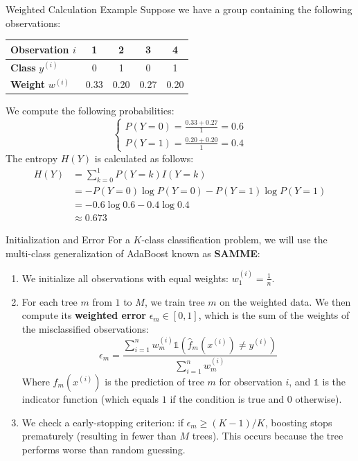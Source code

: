 \begin{frame}{Weighted Calculation Example}
	Suppose we have a group containing the following observations:
	\begin{table}
		\centering
		\begin{tabular}{|l|c|c|c|c|}
			\hline
			\textbf{Observation} $i$ & 1 & 2 & 3 & 4 \\
			\hline
			\textbf{Class} $y^{(i)}$ & 0 & 1 & 0 & 1 \\
			\hline
			\textbf{Weight} $w^{(i)}$ & 0.33 & 0.20 & 0.27 & 0.20 \\
			\hline
		\end{tabular}
	\end{table}
	We compute the following probabilities:
	\begin{equation*}
		\begin{cases}
			P(Y = 0) = \frac{0.33 + 0.27}{1} = 0.6 \\
			P(Y = 1) = \frac{0.20 + 0.20}{1} = 0.4
		\end{cases}
	\end{equation*}
	The entropy $H(Y)$ is calculated as follows:
	\begin{equation*}
		\begin{aligned}
			H(Y) 
			&= \sum_{k=0}^1 P(Y = k) I(Y = k) \\
			&= - P(Y = 0) \log P(Y = 0) - P(Y = 1) \log P(Y = 1) \\
			&= - 0.6 \log 0.6 - 0.4 \log 0.4 \\
			&\approx 0.673
		\end{aligned}
	\end{equation*}
\end{frame}

\begin{frame}{Initialization and Error}
	For a $K$-class classification problem, we will use the multi-class generalization of AdaBoost known as \textbf{SAMME}:
	\begin{enumerate}
		\item We initialize all observations with equal weights: $w_1^{(i)} = \frac{1}{n}$.
		\pause
		\item For each tree $m$ from $1$ to $M$, we train tree $m$ on the weighted data. We then compute its \textbf{weighted error} $\epsilon_m \in [0, 1]$, which is the sum of the weights of the misclassified observations:
		\begin{equation*}
			\epsilon_m = \frac{\sum_{i=1}^n w_m^{(i)} \mathds{1}(\hat{f}_m(x^{(i)}) \neq y^{(i)})}{\sum_{i=1}^n w_m^{(i)}}
		\end{equation*}
		Where $\hat{f}_m(x^{(i)})$ is the prediction of tree $m$ for observation $i$, and $\mathds{1}$ is the indicator function (which equals $1$ if the condition is true and $0$ otherwise).
		\pause
		\item We check a early-stopping criterion: if $\epsilon_m \ge (K - 1)/ K$, boosting stops prematurely (resulting in fewer than $M$ trees). This occurs because the tree performs worse than random guessing.
	\end{enumerate}
\end{frame}

